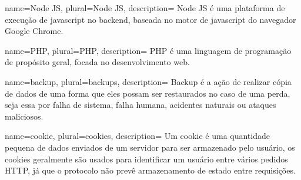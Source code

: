 {
  name=Node JS,
  plural=Node JS,
  description={
    Node JS é uma plataforma de execução de \gls{javascript} no \gls{backend}, baseada no motor de \gls{javascript} do navegador Google Chrome.
  }
}

{
  name=PHP,
  plural=PHP,
  description={
    PHP é uma linguagem de programação de propósito geral, focada no desenvolvimento web.
  }
}

{
  name=backup,
  plural=backups,
  description={
   Backup é a ação de realizar cópia de dados de uma forma que eles possam ser restaurados no caso de uma perda, seja essa por falha de sistema, falha humana, acidentes naturais ou ataques maliciosos.
  }
}

{
  name=cookie,
  plural=cookies,
  description={
   Um cookie é uma quantidade pequena de dados enviados de um servidor para ser armazenado pelo usuário, os cookies geralmente são usados para identificar um usuário entre vários pedidos \gls{HTTP}, já que o protocolo não prevê armazenamento de estado entre requisições.
  }
}
